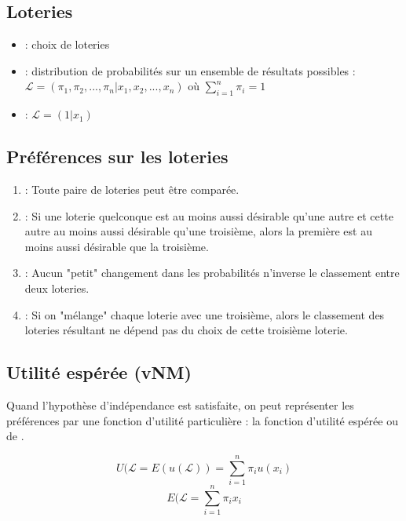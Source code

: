 \subsection{Loteries}

\begin{itemize}
\item {} : choix de loteries
\item {} : distribution de probabilités sur un ensemble de résultats possibles :\\
$\mathcal{L} = (\pi_1, \pi_2, ..., \pi_n|x_1, x_2, ..., x_n)$ où $\displaystyle\sum_{i=1}^{n} \pi_i = 1$
\item {} : $\mathcal{L} = (1|x_1)$
\end{itemize}

\subsection{Préférences sur les loteries}

\begin{enumerate}
\item {} : Toute paire de loteries peut être comparée.
\item {} : Si une loterie quelconque est au moins aussi désirable qu'une autre et cette autre au moins aussi désirable qu'une troisième, alors la première est au moins aussi désirable que la troisième.
\item {} : Aucun "petit" changement dans les probabilités n'inverse le classement entre deux loteries.
\item {} : Si on "mélange" chaque loterie avec une troisième, alors le classement des loteries résultant ne dépend pas du choix de cette troisième loterie.
\end{enumerate}

\subsection{Utilité espérée (vNM)}

Quand l'hypothèse d'indépendance est satisfaite, on peut représenter les préférences par une fonction d'utilité particulière : la fonction d'utilité espérée ou de .

\begin{equation*}
U(\mathcal{L} = E(u(\mathcal{L})) = \displaystyle\sum_{i=1}^{n} \pi_i u(x_i)
\end{equation*}
\begin{equation*}
E(\mathcal{L} = \displaystyle\sum_{i=1}^{n} \pi_i x_i
\end{equation*}

